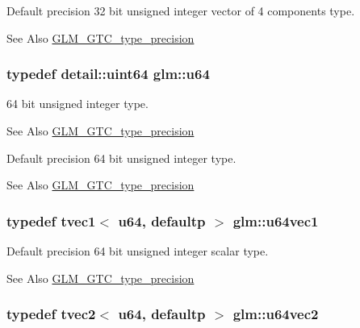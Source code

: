 Default precision 32 bit unsigned integer vector of 4 components type. \begin{DoxySeeAlso}{See Also}
\hyperlink{group__gtc__type__precision}{G\-L\-M\-\_\-\-G\-T\-C\-\_\-type\-\_\-precision} 
\end{DoxySeeAlso}
\hypertarget{group__gtc__type__precision_ga71cedd4972f9cb1a5e14dfe5ab83ecd7}{
\subsubsection[{u64}]{\setlength{\rightskip}{0pt plus 5cm}typedef detail\-::uint64 {\bf glm\-::u64}}}\label{group__gtc__type__precision_ga71cedd4972f9cb1a5e14dfe5ab83ecd7}
64 bit unsigned integer type. \begin{DoxySeeAlso}{See Also}
\hyperlink{group__gtc__type__precision}{G\-L\-M\-\_\-\-G\-T\-C\-\_\-type\-\_\-precision}
\end{DoxySeeAlso}
Default precision 64 bit unsigned integer type. \begin{DoxySeeAlso}{See Also}
\hyperlink{group__gtc__type__precision}{G\-L\-M\-\_\-\-G\-T\-C\-\_\-type\-\_\-precision} 
\end{DoxySeeAlso}
\hypertarget{group__gtc__type__precision_gaf0a59fdb715cf4ddf0c4dabf0e2286a9}{
\subsubsection[{u64vec1}]{\setlength{\rightskip}{0pt plus 5cm}typedef tvec1$<$ u64, defaultp $>$ {\bf glm\-::u64vec1}}}\label{group__gtc__type__precision_gaf0a59fdb715cf4ddf0c4dabf0e2286a9}
Default precision 64 bit unsigned integer scalar type. \begin{DoxySeeAlso}{See Also}
\hyperlink{group__gtc__type__precision}{G\-L\-M\-\_\-\-G\-T\-C\-\_\-type\-\_\-precision} 
\end{DoxySeeAlso}
\hypertarget{group__gtc__type__precision_gaddd85665767e5d32aee8516f00c45f59}{
\subsubsection[{u64vec2}]{\setlength{\rightskip}{0pt plus 5cm}typedef tvec2$<$ u64, defaultp $>$ {\bf glm\-::u64vec2}}}\label{group__gtc__type__precision_gaddd85665767e5d32aee8516f00c45f59}
